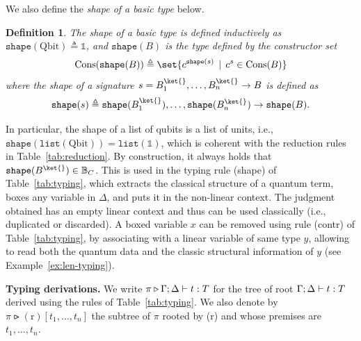 \documentclass[10pt,a4paper]{article}
\newcommand{\bvar}{B}
\newcommand\bkvar{\bvar^{\ket{}}}
\newcommand{\qbit}{\mathrm{Qbit}}
\newcommand{\bcset}{\mathbb{B}_C}
\newcommand{\unit}{\mathbb 1}
\newcommand{\typelist}[1]{\mathtt{list}(#1)}
\newcommand{\cons}[1]{\mathrm{Cons}(#1)}
\newcommand{\shape}[1]{\mathtt{shape}(#1)}
\newcommand{\typing}[4]{
  \ifx&#1&\varnothing \else #1\fi; 
  \ifx&#2&\varnothing \else #2\fi 
  \vdash {#3} : #4
}
\newcommand{\gmid}{\,\mid\,}
\newtheorem{definition}[theorem]{Definition}
\begin{document}
We also define the \emph{shape of a basic type} below.
\begin{definition}
  \label{def:shape-type}
  The shape of a basic type is defined inductively as $\shape \qbit \triangleq
  \unit$, and $\shape \bvar $ is the type defined by the constructor set  
  \[
    \cons{\shape \bvar} \triangleq \set{
      c^{\shape{s}}
      \gmid c^{s} \in \cons \bvar
    }
  \]
  where the shape of a signature $s=\bkvar_1,\ldots,\bkvar_n \to \bvar$ is defined as 
  \[
  \shape{s} \triangleq \shape{\bkvar_1},\ldots,\shape{\bkvar_n} \to \shape{\bvar}.
  \]
\end{definition}
In particular, the shape of a list of qubits is a list of units, i.e.,
$\shape{\typelist{\qbit}} = \typelist{\unit}$, which is coherent with the
reduction rules in Table~\ref{tab:reduction}. By construction, it always holds
that $\shape \bkvar \in \bcset$. This is used in the typing rule (shape) of
Table~\ref{tab:typing}, which extracts the classical structure of a quantum
term, boxes any variable in $\Delta$, and puts it in the non-linear context.
The judgment obtained has an empty linear context and thus can be used
classically (i.e., duplicated or discarded). A boxed variable $x$ can be
removed using rule (contr) of Table~\ref{tab:typing}, by associating with a
linear variable of same type $y$, allowing to read both the quantum data and
the classic structural information of $y$ (see Example~\ref{ex:len-typing}).


\medskip
\noindent
\textbf{Typing derivations. }
We write $\pi \triangleright \typing \Gamma \Delta t T$ for the tree of root
$\typing \Gamma \Delta t T$ derived using the rules of Table~\ref{tab:typing}.
We also denote by $\pi \rightslice \mathrm{(r)}[t_1, \dots, t_n]$ the subtree
of $\pi$ rooted by (r) and whose premises are $t_1, \dots, t_n$.
\end{document}
